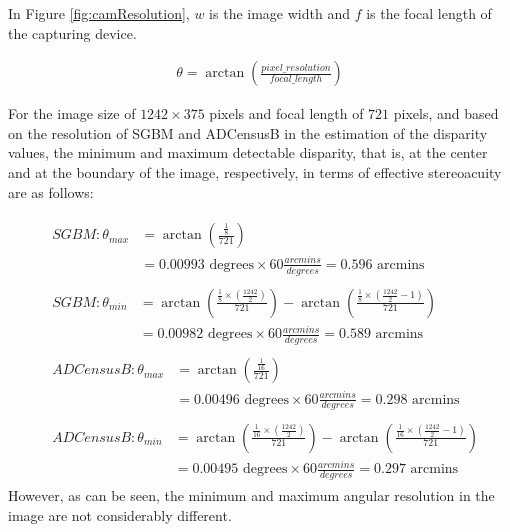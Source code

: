 \noindent
In Figure \ref{fig:camResolution}, $w$ is the image width and $f$ is the focal length of the capturing device.

\begin{align}
\label{eq:algResolution}
\theta = \arctan(\frac{pixel\_resolution}{focal\_length})
\end{align}

For the image size of $1242\times375$ pixels and focal length of $721$ pixels, 
and based on the resolution of SGBM and ADCensusB in the estimation of the disparity values, 
the minimum and maximum detectable disparity, that is, at the center and at the boundary of the image, respectively, 
in terms of effective stereoacuity are as follows:

\begin{align}
\label{eq:algsgbmresolv} 
&\begin{aligned}
SGBM: \theta_{max} &= \arctan (\frac{\frac{1}{8}}{721}) \\
&= 0.00993 \text{ degrees} \times 60 \frac{arcmins}{degrees} = 0.596 \text{ arcmins}
\end{aligned}\\[2ex]
&\begin{aligned}
SGBM: \theta_{min} &= \arctan (\frac{\frac{1}{8}\times(\frac{1242}{2})}{721}) - \arctan (\frac{\frac{1}{8}\times(\frac{1242}{2}-1)}{721}) \\
&= 0.00982 \text{ degrees} \times 60 \frac{arcmins}{degrees} = 0.589 \text{ arcmins}
\end{aligned}\\[2ex]
&\begin{aligned}
ADCensusB: \theta_{max} &= \arctan (\frac{\frac{1}{16}}{721}) \\
&= 0.00496 \text{ degrees} \times 60 \frac{arcmins}{degrees}= 0.298 \text{ arcmins} 
\label{eq:adcenresolv}
\end{aligned}\\[2ex]
&\begin{aligned}
ADCensusB: \theta_{min} &= \arctan (\frac{\frac{1}{16}\times(\frac{1242}{2})}{721}) - \arctan (\frac{\frac{1}{16}\times(\frac{1242}{2}-1)}{721}) \\
&= 0.00495 \text{ degrees} \times 60 \frac{arcmins}{degrees}= 0.297 \text{ arcmins}
\end{aligned}
\end{align} \newline
\noindent
However, as can be seen, the minimum and maximum angular resolution in the image are not considerably different.

